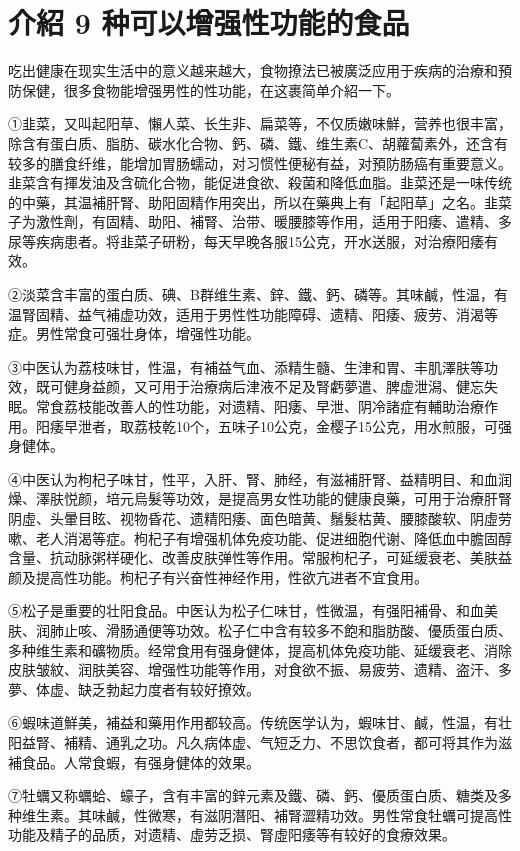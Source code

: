 \documentclass[12pt,UTF8]{ctexbook}
\begin{document}
\section{介紹 9 种可以增强性功能的食品}

吃出健康在现实生活中的意义越来越大，食物撩法已被廣泛应用于疾病的治療和預防保健，很多食物能增强男性的性功能，在这裹简单介紹一下。

①韭菜，又叫起阳草、懶人菜、长生非、扁菜等，不仅质嫩味鮮，营养也很丰富，除含有蛋白质、脂肪、碳水化合物、鈣、磷、鐵、维生素C、胡蘿蔔素外，还含有较多的膳食纤维，能增加胃肠蠕动，对习惯性便秘有益，对預防肠癌有重要意义。韭菜含有揮发油及含硫化合物，能促进食欲、殺菌和降低血脂。韭菜还是一味传统的中藥，其温補肝腎、助阳固精作用突出，所以在藥典上有「起阳草」之名。韭菜子为激性劑，有固精、助阳、補腎、治带、暖腰膝等作用，适用于阳痿、遣精、多尿等疾病患者。将韭菜子研粉，每天早晚各服15公克，开水送服，对治療阳痿有效。

②淡菜含丰富的蛋白质、碘、B群维生素、鋅、鐵、鈣、磷等。其味鹹，性温，有温腎固精、益气補虚功效，适用于男性性功能障碍、遗精、阳痿、疲劳、消渴等症。男性常食可强壮身体，增强性功能。

③中医认为荔枝味甘，性温，有補益气血、添精生髓、生津和胃、丰肌澤肤等功效，既可健身益颜，又可用于治療病后津液不足及腎虧夢遣、脾虚泄潟、健忘失眠。常食荔枝能改善人的性功能，对遗精、阳痿、早泄、阴冷諸症有輔助治療作用。阳痿早泄者，取荔枝乾10个，五味子10公克，金樱子15公克，用水煎服，可强身健体。

④中医认为枸杞子味甘，性平，入肝、腎、肺经，有滋補肝腎、益精明目、和血润燥、澤肤悦颜，培元烏髮等功效，是提高男女性功能的健康良藥，可用于治療肝腎阴虛、头暈目眩、视物昏花、遗精阳痿、面色暗黄、鬚髮枯黄、腰膝酸软、阴虛劳嗽、老人消渴等症。枸杞子有增强机体免疫功能、促进细胞代谢、降低血中膽固醇含量、抗动脉粥样硬化、改善皮肤弹性等作用。常服枸杞子，可延缓衰老、美肤益颜及提高性功能。枸杞子有兴奋性神经作用，性欲亢进者不宜食用。

⑤松子是重要的壮阳食品。中医认为松子仁味甘，性微温，有强阳補骨、和血美肤、润肺止咳、滑肠通便等功效。松子仁中含有较多不飽和脂肪酸、優质蛋白质、多种维生素和礦物质。经常食用有强身健体，提高机体免疫功能、延缓衰老、消除皮肤皱紋、润肤美容、增强性功能等作用，对食欲不振、易疲劳、遗精、盗汗、多夢、体虚、缺乏勃起力度者有较好撩效。

⑥蝦味道鮮美，補益和藥用作用都较高。传统医学认为，蝦味甘、鹹，性温，有壮阳益腎、補精、通乳之功。凡久病体虚、气短乏力、不思饮食者，都可将其作为滋補食品。人常食蝦，有强身健体的效果。

⑦牡蠣又称蠣蛤、蠔子，含有丰富的鋅元素及鐵、磷、鈣、優质蛋白质、糖类及多种维生素。其味鹹，性微寒，有滋阴潛阳、補腎澀精功效。男性常食牡蠣可提高性功能及精子的品质，对遗精、虛劳乏损、腎虛阳痿等有较好的食療效果。
\end{document}
